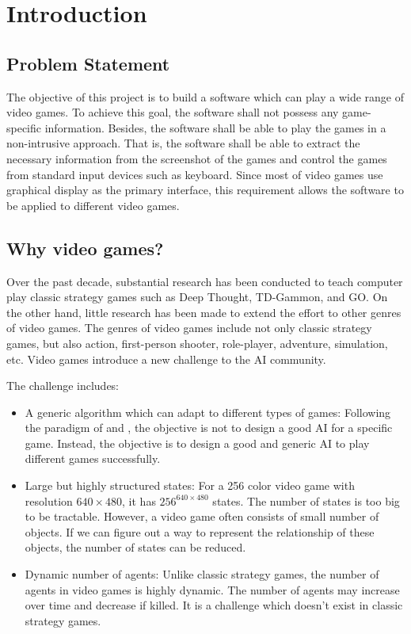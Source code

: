 
\chapter{Introduction}
\label{ch:intro}

\section{Problem Statement}
The objective of this project is to build a software which can play a wide range 
of video games. To achieve this goal, the software shall not possess any game-specific 
information. Besides, the software shall be able to play the games in a non-intrusive approach.
That is, the software shall be able to extract the necessary information 
from the screenshot of the games and control the games from standard input devices such as keyboard.
Since most of video games use graphical display as the primary interface, this requirement allows
the software to be applied to different video games.

\section{Why video games?}
Over the past decade, substantial research has been conducted to teach computer play classic strategy games such
as Deep Thought\cite{DeepBlue}, TD-Gammon\cite{Gammon}, and GO\cite{Go}.
On the other hand, little research has been made\cite{FPS}\cite{Mario} to extend the effort to other genres of video games.
The genres of video games include not only classic strategy games, but also action, first-person shooter, role-player, adventure, simulation, etc.
Video games introduce a new challenge to the AI community.

The challenge includes:
\begin{itemize}{}

\item A generic algorithm which can adapt to different types of games:
Following the paradigm of \cite{GGP} and \cite{Yavar}, the objective is not to design a good AI for
a specific game. Instead, the objective is to design a good and generic AI to play different games successfully.

\item Large but highly structured states:
For a 256 color video game with resolution $640 \times 480$, it has $256^{640 \times 480}$ states.
The number of states is too big to be tractable. However, a video game often consists of small number of objects.
If we can figure out a way to represent the relationship of these objects, the number of states
can be reduced.

\item Dynamic number of agents:
Unlike classic strategy games, the number of agents in video games is highly dynamic.
The number of agents may increase over time and decrease if killed.
It is a challenge which doesn't exist in classic strategy games.
\end{itemize}

